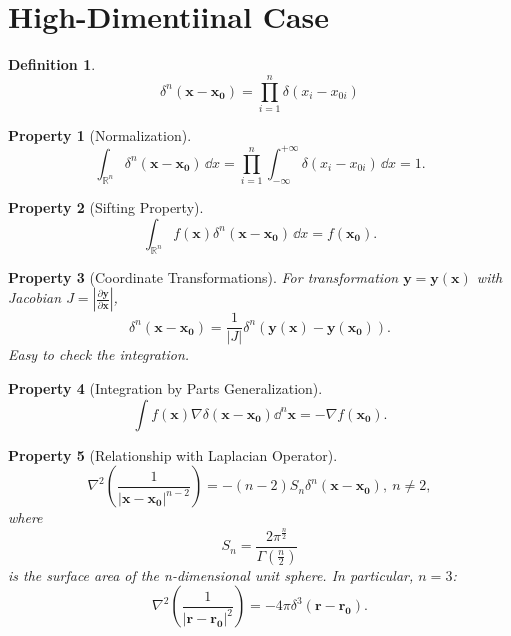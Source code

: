 \documentclass{article}
\newcommand{\pa}{\partial}
\theoremstyle{1}
\newtheorem{definition}{Definition}
\newtheorem{property}{Property}
\theoremstyle{2}
\begin{document}
\section{High-Dimentiinal Case}
\begin{definition}
    \begin{equation}
        \delta^n(\mathbf{x-x_0})=\prod_{i=1}^{n}\delta(x_i-x_{0i})
    \end{equation}
\end{definition}
\begin{property}[Normalization]
    \begin{equation}
           \int_{\mathbb{R}^n}\delta^n(\mathbf{x-x_0})\, \dd x=\prod_{i=1}^{n}\int_{-\infty}^{+\infty}\delta(x_i-x_{0i})\, \dd x=1. 
    \end{equation}
\end{property}
\begin{property}[Sifting Property]
    \begin{equation}
    \int_{\mathbb{R}^n}f(\mathbf{x})\delta^n(\mathbf{x-x_0})\, \dd x=f(\mathbf{x_0}).
    \end{equation}
\end{property}
\begin{property}[Coordinate Transformations]
    For transformation $\mathbf{y}=\mathbf{y}(\mathbf{x})$ with Jacobian $J=\left|\frac{\pa \mathbf{y}}{\pa \mathbf{x}}\right|$,
    \begin{equation}
        \delta^n(\mathbf{x-x_0})=\frac{1}{\left|J\right|}\delta^n(\mathbf{y(x)-y(x_0)}).
    \end{equation}
    Easy to check the integration.
\end{property}
\begin{property}[Integration by Parts Generalization]
    \begin{equation}
        \int f(\mathbf{x})\nabla\delta(\mathbf{x-x_0})\dd^n \mathbf{x}=-\nabla f(\mathbf{x_0}).
    \end{equation}
\end{property}
\begin{property}[Relationship with Laplacian Operator]
    \begin{equation}
        \nabla^2\left(\frac{1}{\left|\mathbf{x-x_0}\right|^{n-2}}\right)=-(n-2)S_n\delta^n(\mathbf{x-x_0}),\ n\not=2,
    \end{equation}
    where 
    \begin{equation}
        S_n=\frac{2\pi^{\frac{n}{2}}}{\Gamma\left(\frac{n}{2}\right)}
    \end{equation}
    is the surface area of the n-dimensional unit sphere. In particular, $n=3$:
    \begin{equation}
        \nabla^2\left(\frac{1}{\left|\mathbf{r-r_0}\right|^2}\right)=-4\pi\delta^3(\mathbf{r-r_0}).
    \end{equation}
\end{property}
\end{document}
